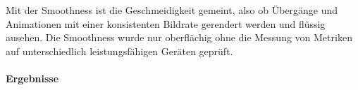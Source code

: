 Mit der Smoothness ist die Geschmeidigkeit gemeint, also ob Übergänge und Animationen mit einer konsistenten Bildrate gerendert werden und flüssig ausehen. Die Smoothness wurde nur oberflächig ohne die Messung von Metriken auf unterschiedlich leistungsfähigen Geräten geprüft.

\paragraph{Ergebnisse}




